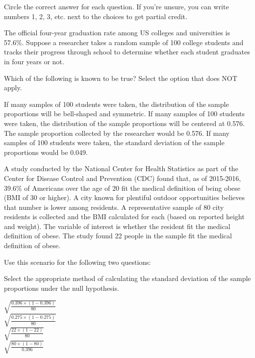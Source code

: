 \documentclass{article}
\begin{document}
	Circle the correct answer for each question.  If you're unsure, you can write numbers 1, 2, 3, etc. next to the choices to get partial credit.\\[.5cm]
	\begin{mcquestions}
		
	\question The official four-year graduation rate among US colleges and universities is 57.6\%. Suppose a researcher takes a random sample of 100 college students and tracks their progress through school to determine whether each student graduates in four years or not.
	
	Which of the following is known to be true? Select the option that does NOT apply.
	
	\begin{mcanswerslist}
		\answer If many samples of 100 students were taken, the distribution of the sample proportions will be bell-shaped and symmetric.
		\answer If many samples of 100 students were taken, the distribution of the sample proportions will be centered at 0.576.
		\answer[correct] The sample proportion collected by the researcher would be 0.576.
		\answer If many samples of 100 students were taken, the standard deviation of the sample proportions would be 0.049.
	\end{mcanswerslist}
	
	\begin{mcquestioninstruction}
		A study conducted by the National Center for Health Statistics as part of the Center for Disease Control and Prevention (CDC) found that, as of 2015-2016, 39.6\% of Americans over the age of 20 fit the medical definition of being obese (BMI of 30 or higher). A city known for plentiful outdoor opportunities believes that number is lower among residents. A representative sample of 80 city residents is collected and the BMI calculated for each (based on reported height and weight). The variable of interest is whether the resident fit the medical definition of obese. The study found 22 people in the sample fit the medical definition of obese.
		
		Use this scenario for the following two questions:
	\end{mcquestioninstruction}
	
	\question[follow] Select the appropriate method of calculating the standard deviation of the sample proportions under the null hypothesis.
	
	\begin{mcanswerslist}
		\answer[correct] \(\sqrt{\frac{0.396 \times (1-0.396)}{80}}\)\\[0.1cm]
		\answer \(\sqrt{\frac{0.275 \times (1-0.275)}{80}}\)\\[0.1cm]
		\answer \(\sqrt{\frac{22 \times (1-22)}{80}}\)\\[0.1cm]
		\answer \(\sqrt{\frac{80 \times (1-80)}{0.396}}\)\\[0.1cm]
	\end{mcanswerslist}
	

\end{mcquestions}
\end{document}

